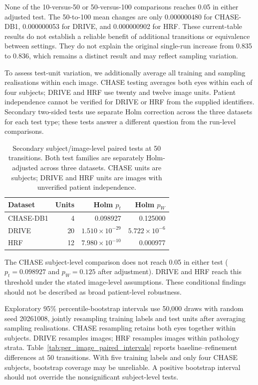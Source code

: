 \documentclass[jimaging,article,submit,pdftex,moreauthors]
  {Definitions/mdpi}
\begin{document}
None of the 10-versus-50 or 50-versus-100 comparisons reaches 0.05 in either adjusted test. The 50-to-100 mean changes are only 0.000000480 for CHASE-DB1, 0.000000053 for DRIVE, and 0.000000902 for HRF. These current-table results do not establish a reliable benefit of additional transitions or equivalence between settings. They do not explain the original single-run increase from 0.835 to 0.836, which remains a distinct result and may reflect sampling variation.

To assess test-unit variation, we additionally average all training and sampling realisations within each image. CHASE testing averages both eyes within each of four subjects; DRIVE and HRF use twenty and twelve image units. Patient independence cannot be verified for DRIVE or HRF from the supplied identifiers. Secondary two-sided tests use separate Holm correction across the three datasets for each test type; these tests answer a different question from the run-level comparisons.

\begin{table}[htbp]
\centering
\caption{Secondary subject/image-level paired tests at 50 transitions. Both test families are separately Holm-adjusted across three datasets. CHASE units are subjects; DRIVE and HRF units are images with unverified patient independence.}
\label{tab:paired_statistical_tests}
\scriptsize
\begin{tabular}{lrrr}
\toprule
Dataset & Units & Holm $p_t$ & Holm $p_W$ \\
\midrule
CHASE-DB1 & 4 & 0.098927 & 0.125000 \\
DRIVE & 20 & $1.510\times10^{-29}$ & $5.722\times10^{-6}$ \\
HRF & 12 & $7.980\times10^{-10}$ & 0.000977 \\
\bottomrule
\end{tabular}
\end{table}

The CHASE subject-level comparison does not reach 0.05 in either test ($p_t=0.098927$ and $p_W=0.125$ after adjustment). DRIVE and HRF reach this threshold under the stated image-level assumptions. These conditional findings should not be described as broad patient-level robustness.

Exploratory 95\% percentile-bootstrap intervals use 50,000 draws with random seed 20261008, jointly resampling training labels and test units after averaging sampling realisations. CHASE resampling retains both eyes together within subjects. DRIVE resamples images; HRF resamples images within pathology strata. Table~\ref{tab:per_image_paired_intervals} reports baseline--refinement differences at 50 transitions. With five training labels and only four CHASE subjects, bootstrap coverage may be unreliable. A positive bootstrap interval should not override the nonsignificant subject-level tests.
\end{document}

